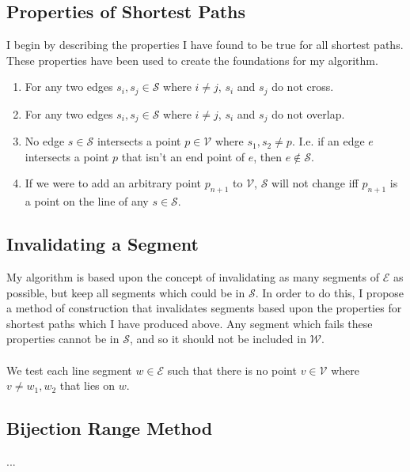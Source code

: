 \documentclass[12pt]{article}
\begin{document}
\subsection{Properties of Shortest Paths}\label{subsec:props}
I begin by describing the properties I have found to be true for all shortest
paths. These properties have been used to create the foundations for my algorithm.
\begin{enumerate}
\item For any two edges $s_i,s_j \in \mathcal{S}$ where
$i \neq j$, $s_i$ and $s_j$ do not cross. 
\item For any two edges $s_i,s_j \in \mathcal{S}$ where
$i \neq j$, $s_i$ and $s_j$ do not overlap. 
\item No edge $s \in \mathcal{S}$ intersects a point
$p \in \mathcal{V}$ where $s_1,s_2 \neq p$.
I.e. if an edge $e$ intersects a point $p$ that isn't an end point of $e$,
then $e \notin \mathcal{S}$.
\item If we were to add an arbitrary point $p_{n+1}$ to $\mathcal{V}$, $\mathcal{S}$
will not change iff $p_{n+1}$ is a point on the line of any $s \in \mathcal{S}$.
\end{enumerate}

\subsection{Invalidating a Segment}\label{subsec:invalid}
My algorithm is based upon the concept of invalidating as many segments of $\mathcal{E}$
as possible, but keep all segments which could be in $\mathcal{S}$. In order to do this,
I propose a method of construction that invalidates segments based upon the
properties for shortest paths which I have produced
above. Any segment which fails these properties cannot be in $\mathcal{S}$,
and so it should
not be included in $\mathcal{W}$.
\\\\
We test each line segment $w \in \mathcal{E}$ such that there is no point
$v \in \mathcal{V}$
where $v \neq w_1,w_2$ that lies on $w$.

\subsection*{Bijection Range Method}\label{subsec*:bijection-range-method}
...
\end{document}
